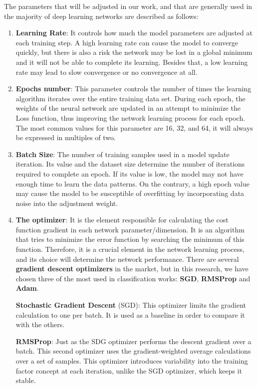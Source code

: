 The parameters that will be adjusted in our work, and that are generally used in the majority of deep learning networks are described as follows:

\begin{enumerate}
    \item \textbf{Learning Rate}: It controls how much the model parameters are adjusted at each training step. A high learning rate can cause the model to converge quickly, but there is also a risk the network may be lost in a global minimum and it will not be able to complete its learning. Besides that, a low learning rate may lead to slow convergence or no convergence at all.

    \item \textbf{Epochs number}: This parameter controls the number of times the learning algorithm iterates over the entire training data set. During each epoch, the weights of the neural network are updated in an attempt to minimize the Loss function, thus improving the network learning process for each epoch. The most common values for this parameter are 16, 32, and 64, it will always be expressed in multiples of two.

    \item \textbf{Batch Size}: The number of training samples used in a model update iteration. Its value and the dataset size determine the number of iterations required to complete an epoch. If its value is low, the model may not have enough time to learn the data patterns. On the contrary, a high epoch value may cause the model to be susceptible of overfitting by incorporating data noise into the adjustment weight.

    \item \textbf{The optimizer}: It is the element responsible for calculating the cost function gradient in each network parameter/dimension. It is an algorithm that tries to minimize the error function by searching the minimum of this function. Therefore, it is a crucial element in the network learning process, and its choice will determine the network performance. There are several \textbf{gradient descent optimizers} in the market, but in this research, we have chosen three of the most used in classification works: \textbf{SGD}, \textbf{RMSProp} and \textbf{Adam}.

    \textbf{Stochastic Gradient Descent} (SGD): This optimizer limits the gradient calculation to one per batch. It is used as a baseline in order to compare it with the others.

    \textbf{RMSProp}: Just as the SDG optimizer performs the descent gradient over a batch. This second optimizer uses the gradient-weighted average calculations over a set of samples.  This optimizer introduces variability into the training factor concept at each iteration, unlike the SGD optimizer, which keeps it stable.


\end{enumerate}
